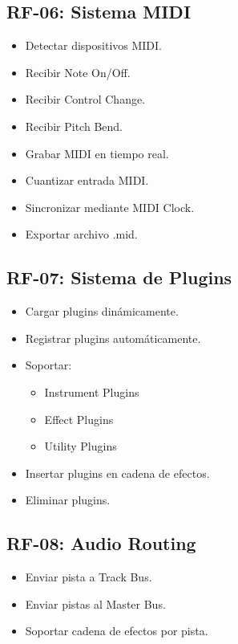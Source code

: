 \documentclass[12pt]{article}
\begin{document}
\subsection{RF-06: Sistema MIDI}

\begin{itemize}
\item Detectar dispositivos MIDI.
\item Recibir Note On/Off.
\item Recibir Control Change.
\item Recibir Pitch Bend.
\item Grabar MIDI en tiempo real.
\item Cuantizar entrada MIDI.
\item Sincronizar mediante MIDI Clock.
\item Exportar archivo .mid.
\end{itemize}

\subsection{RF-07: Sistema de Plugins}

\begin{itemize}
\item Cargar plugins dinámicamente.
\item Registrar plugins automáticamente.
\item Soportar:
\begin{itemize}
    \item Instrument Plugins
    \item Effect Plugins
    \item Utility Plugins
\end{itemize}
\item Insertar plugins en cadena de efectos.
\item Eliminar plugins.
\end{itemize}

\subsection{RF-08: Audio Routing}

\begin{itemize}
\item Enviar pista a Track Bus.
\item Enviar pistas al Master Bus.
\item Soportar cadena de efectos por pista.
\end{itemize}
\end{document}
